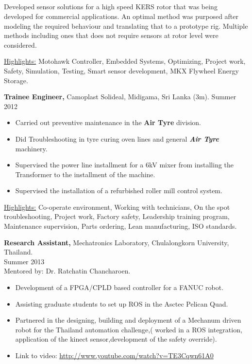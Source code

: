 \documentclass[margin]{res}
\begin{document}
\begin{resume}
\section{}
Developed sensor solutions for a high speed KERS rotor that was being developed for commercial applications. An optimal method was purposed after modeling the required behaviour and translating that to a prototype rig. Multiple methods including ones that does not require sensors at rotor level were considered.   

\underline{Highlights:} Motohawk Controller, Embedded Systems, Optimizing,
Project work, Safety, Simulation, Testing, Smart sensor development, MKX
Flywheel Energy Storage.

{\bf Trainee Engineer,} Camoplast Solideal, Midigama, Sri Lanka (3m).
\hfill Summer 2012 

\begin{itemize} \itemsep -2pt  %
\item Carried out preventive maintenance in the {\bf Air Tyre} division.
\item Did Troubleshooting in tyre curing oven lines and general
\textit{\bf Air Tyre} machinery.
\item Supervised the power line installment for a 6kV mixer from installing the
Transformer to the installment of the machine.
\item Supervised the installation of a refurbished roller mill control system.
\end{itemize}
\underline{Highlights:} Co-operate environment, Working with
technicians, On the spot troubleshooting, Project work, Factory safety,
Leadership training program, Maintenance supervision, Parts ordering, Lean
manufacturing, ISO standards.


{\bf Research Assistant,} Mechatronics Laboratory, Chulalongkorn University,
Thailand. \\ \phantom \hfill  \hfill Summer 2013 \\ Mentored by:
Dr.
Ratchatin Chancharoen.
\begin{itemize}
  \itemsep -2pt %
  \item Development of a FPGA/CPLD based controller for a
  FANUC\textsuperscript{{\ssmall\texttrademark}} robot.
  \item Assisting graduate students to set up ROS in the Asctec Pelican
  Quad.
  \item Partnered in the designing, building and deployment of a Mechanum
  driven robot for the Thailand automation challenge,( worked in a ROS
  integration, application of the kinect sensor,development of the safety
  override). 
  \item[] Link to video: \url{http://www.youtube.com/watch?v=TE3Cqwn61A0}
  

\end{itemize}
\end{resume}
\end{document}
